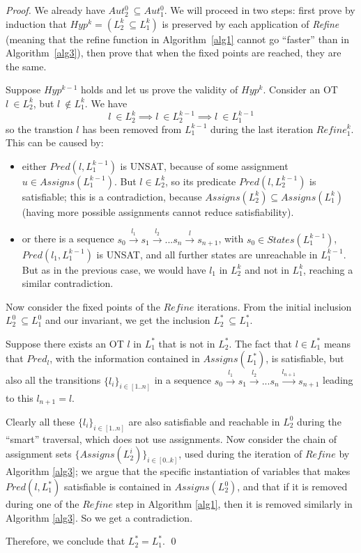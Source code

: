 \documentclass[smallcondensed]{svjour3}
\begin{document}
\begin{proof}
We already have $Aut_2^0\ \subseteq Aut_1^0$.
We will proceed in two steps:
first prove by induction that $Hyp^k = (L_2^k\ \subseteq L_1^k)$ is
preserved by each application of \textit{Refine} (meaning that the refine function
in Algorithm~\ref{alg1} cannot go ``faster'' than in Algorithm~\ref{alg3}), then prove
that when the fixed points are reached, they are the same. 

Suppose $Hyp^{k-1}$ holds and let us prove the validity of $Hyp^k$.
Consider an OT $l\ \in L_2^k$, but $l\ \notin L_1^k$.
We have \[ l\ \in L_2^k \implies l\ \in L_2^{k-1} \implies l\ \in
L_1^{k-1}\] so the transtion $l$ has been removed from $L_1^{k-1}$ during the last
iteration $Refine_1^k$. This can be caused by:
\begin{itemize}
\item
  either $Pred(l,L_1^{k-1})$ is UNSAT, because of some assignment
    $u \in Assigns(L_1^{k-1})$. But $l \in L_2^k$, so its predicate
    $Pred(l,L_2^{k-1})$ is satisfiable; this is a contradiction,
    because $Assigns(L_2^k) \subseteq Assigns(L_1^k)$ (having
    more possible assignments cannot reduce satisfiability).
  \item
    or there is a sequence
    $s_0\xrightarrow{l_1}s_1\xrightarrow{l_2}...s_{n}\xrightarrow{l}s_{n+1}$,
    with $s_0 \in States(L_1^{k-1})$, $Pred(l_1,L_1^{k-1})$ is UNSAT, and
    all further states are unreachable in $L_1^{k-1}$. But as in the
    previous case, we would have $l_1$ in $L_2^k$ and not in $L_1^k$,
    reaching a similar contradiction.
\end{itemize}

\smallskip
Now consider the fixed points of the $Refine$ iterations. From the
initial inclusion $L_2^0\ \subseteq L_1^0$ and our invariant, we get the
inclusion  $L_2^*\ \subseteq L_1^*$.

Suppose there exists an OT $l$ in $L_1^*$ that is not in $L_2^*$.
The fact that $l \in L_1^*$ means that $Pred_l$, with the information contained in $Assigns(L_1^*)$, is satisfiable, but also all the transitions $\{l_i\}_{i \in [1..n]}$ in a sequence
$s_0\xrightarrow{l_1}s_1\xrightarrow{l_2}...s_{n}\xrightarrow{l_{n+1}}s_{n+1}$ leading to this $l_{n+1}=l$.

Clearly all these $\{l_i\}_{i \in [1..n]}$ are also satisfiable and reachable in $L_2^0$ during the ``smart'' traversal, which does not use assignments. Now consider the chain of assignment sets $\{Assigns(L_2^i)\}_{i \in [0..k]}$, used during the iteration of $Refine$ by Algorithm \ref{alg3}; we argue that the specific instantiation of variables that makes $Pred(l,L_1^*)$ satisfiable is contained in $Assigns(L_2^0)$, and that if it is removed during one of the $Refine$ step in Algorithm \ref{alg1}, then it is removed similarly in Algorithm \ref{alg3}. So we get a contradiction.


Therefore, we conclude that $L_2^* = L_1^*$.
\hfill\qed
\end{proof}
\end{document}
